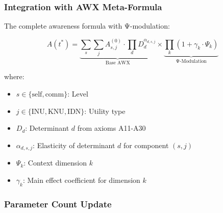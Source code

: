 \subsubsection{Integration with AWX Meta-Formula}

The complete awareness formula with Ψ-modulation:

\begin{equation}
\boxed{
A(t^*) = \underbrace{\sum_s \sum_j A_{s,j}^{(0)} \cdot \prod_d D_d^{\alpha_{d,s,j}}}_{\text{Base AWX}} \times \underbrace{\prod_k (1 + \gamma_k \cdot \Psi_k)}_{\text{Ψ-Modulation}}
}
\end{equation}

where:
\begin{itemize}
    \item $s \in \{\text{self}, \text{comm}\}$: Level
    \item $j \in \{\text{INU}, \text{KNU}, \text{IDN}\}$: Utility type
    \item $D_d$: Determinant $d$ from axioms A11-A30
    \item $\alpha_{d,s,j}$: Elasticity of determinant $d$ for component $(s,j)$
    \item $\Psi_k$: Context dimension $k$
    \item $\gamma_k$: Main effect coefficient for dimension $k$
\end{itemize}

\subsubsection{Parameter Count Update}

